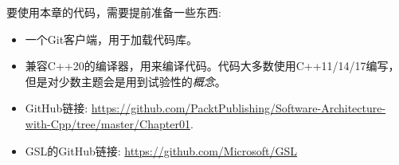 要使用本章的代码，需要提前准备一些东西:

\begin{itemize}
\item 
一个Git客户端，用于加载代码库。

\item 
兼容C++20的编译器，用来编译代码。代码大多数使用C++11/14/17编写，但是对少数主题会是用到试验性的\textit{概念}。

\item 
GitHub链接: \url{https://github.com/PacktPublishing/Software-Architecture-with-Cpp/tree/master/Chapter01}.

\item 
GSL的GitHub链接: \url{https://github.com/Microsoft/GSL}

\end{itemize}